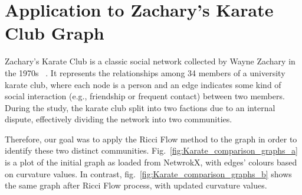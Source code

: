 \section{Application to Zachary's Karate Club Graph}
\label{sec5.3}

Zachary’s Karate Club is a classic social network collected by Wayne Zachary in the 1970s ~\cite{ZacharyKarateClubGraph}. It represents the relationships among 34 members of a university karate club, where each node is a person and an edge indicates some kind of social interaction (e.g., friendship or frequent contact) between two members. During the study, the karate club split into two factions due to an internal dispute, effectively dividing the network into two communities.

Therefore, our goal was to apply the Ricci Flow method to the graph in order to identify these two distinct communities.
Fig.~\ref{fig:Karate_comparison_graphs_a} is a plot of the initial graph as loaded from NetwrokX, with edges' colours based on curvature values. In contrast, fig.~\ref{fig:Karate_comparison_graphs_b} shows the same graph after Ricci Flow process, with updated curvature values. 
